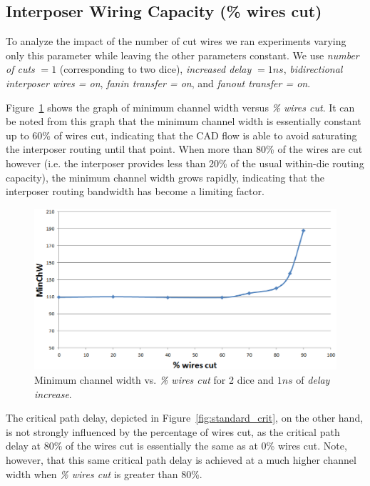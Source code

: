 \documentclass[journal]{IEEEtran}
\begin{document}
\subsection{Interposer Wiring Capacity (\% wires cut)}
\label{sec:resultsWiringCapacity}

To analyze the impact of the number of cut wires we ran experiments varying only this parameter while leaving the other parameters constant. We use \textit{number of cuts} $= 1$ (corresponding to two dice), \textit{increased delay} $= 1ns$, \textit{bidirectional interposer wires = on}, \textit{fanin transfer = on}, and \textit{fanout transfer = on}.

Figure~\ref{fig:standard_minW} shows the graph of minimum channel width versus \textit{\% wires cut}. It can be noted from this graph that the minimum channel width is essentially constant up to 60\% of wires cut, indicating that the CAD flow is able to avoid saturating the interposer routing until that point. When more than 80\% of the wires are cut however (i.e. the interposer provides less than 20\% of the usual within-die routing capacity), the minimum channel width grows rapidly, indicating that the interposer routing bandwidth has become a limiting factor.

\begin{figure}[!htbp]
\centering
\includegraphics[width=\linewidth]{minChW.eps}
\caption{Minimum channel width vs. \textit{\% wires cut} for 2 dice and $1ns$ of \textit{delay increase}.}
\label{fig:standard_minW}
\end{figure}

The critical path delay, depicted in Figure~\ref{fig:standard_crit}, on the other hand, is not strongly influenced by the percentage of wires cut, as the critical path delay at 80\% of the wires cut is essentially the same as at 0\% wires cut. Note, however, that this same critical path delay is achieved at a much higher channel width when \textit{\% wires cut} is greater than 80\%.
\end{document}
